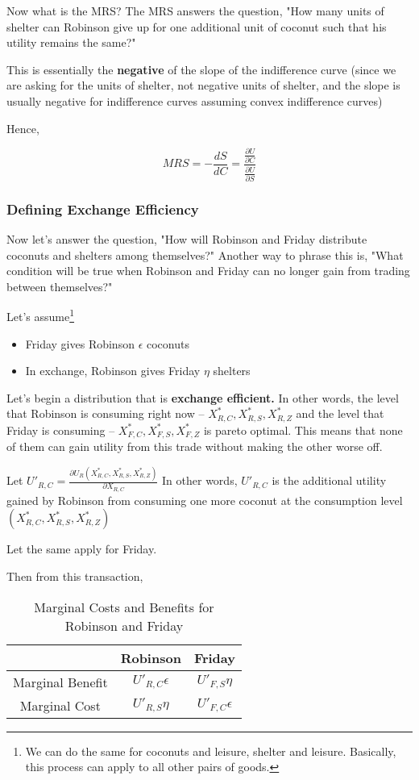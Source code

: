 \documentclass[11pt]{scrartcl}
\begin{document}
Now what is the MRS? The MRS answers the question, "How many units of shelter can Robinson give up for one additional unit of coconut such that his utility remains the same?"

This is essentially the \textbf{negative} of the slope of the indifference curve (since we are asking for the units of shelter, not negative units of shelter, and the slope is usually negative for indifference curves assuming convex indifference curves)

Hence, 

\[MRS = -\frac{dS}{dC} = \frac{\frac{\partial U}{\partial C}}{\frac{\partial U}{\partial S}}\]

\subsubsection{Defining Exchange Efficiency}

Now let's answer the question, "How will Robinson and Friday distribute coconuts and shelters among themselves?" Another way to phrase this is, "What condition will be true when Robinson and Friday can no longer gain from trading between themselves?"

Let's assume\footnote{We can do the same for coconuts and leisure, shelter and leisure. Basically, this process can apply to all other pairs of goods.}

\begin{itemize}
\item Friday gives Robinson $\epsilon$ coconuts
\item In exchange, Robinson gives Friday $\eta$ shelters
\end{itemize}

Let's begin a distribution that is \textbf{exchange efficient.} In other words, the level that Robinson is consuming right now -- $X^*_{R,C}, X^*_{R,S}, X^*_{R,Z}$ and the level that Friday is consuming -- $X^*_{F,C}, X^*_{F,S}, X^*_{F,Z}$ is pareto optimal. This means that none of them can gain utility from this trade without making the other worse off.

Let $U'_{R,C} = \frac{\partial U_R(X^*_{R,C}, X^*_{R,S}, X^*_{R,Z})}{\partial X_{R,C}}$ In other words, $U'_{R,C}$ is the additional utility gained by Robinson from consuming one more coconut at the consumption level $(X^*_{R,C}, X^*_{R,S}, X^*_{R,Z})$

Let the same apply for Friday.

Then from this transaction,

\begin{table}[ht!]
\begin{longtable}{c|cc}
\hline
 & Robinson & Friday \\
\hline
Marginal Benefit & $U'_{R,C} \epsilon$ & $U'_{F,S} \eta$ \\
Marginal Cost & $U'_{R,S} \eta$ & $U'_{F,C} \epsilon$ \\
\hline
\end{longtable}
\caption{Marginal Costs and Benefits for Robinson and Friday}
\end{table}
\end{document}
